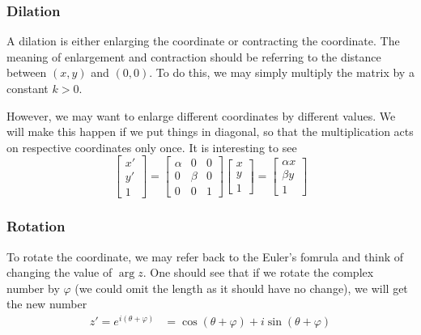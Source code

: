 \documentclass[12pt]{article}
\begin{document}
    \subsubsection*{Dilation}
    A dilation is either enlarging the coordinate or contracting the coordinate. The meaning of enlargement and contraction should be referring to the distance between $(x,y)$ and $(0,0)$. To do this, we may simply multiply the matrix by a constant $k>0$.

    However, we may want to enlarge different coordinates by different values. We will make this happen if we put things in diagonal, so that the multiplication acts on respective coordinates only once. It is interesting to see $$\begin{bmatrix}
        x'\\y'\\1
    \end{bmatrix}=\begin{bmatrix}
        \alpha&0&0\\0&\beta&0\\0&0&1
    \end{bmatrix}\begin{bmatrix}
        x\\y\\1
    \end{bmatrix}=\begin{bmatrix}
        \alpha x\\\beta y\\ 1
    \end{bmatrix}$$

    \subsubsection*{Rotation}
    To rotate the coordinate, we may refer back to the Euler's fomrula and think of changing the value of $\arg{z}$. One should see that if we rotate the complex number by $\varphi$ (we could omit the length as it should have no change), we will get the new number \begin{align*}
        z'=e^{i(\theta+\varphi)}&=\cos(\theta+\varphi)+i\sin(\theta+\varphi)
    \end{align*}
\end{document}
